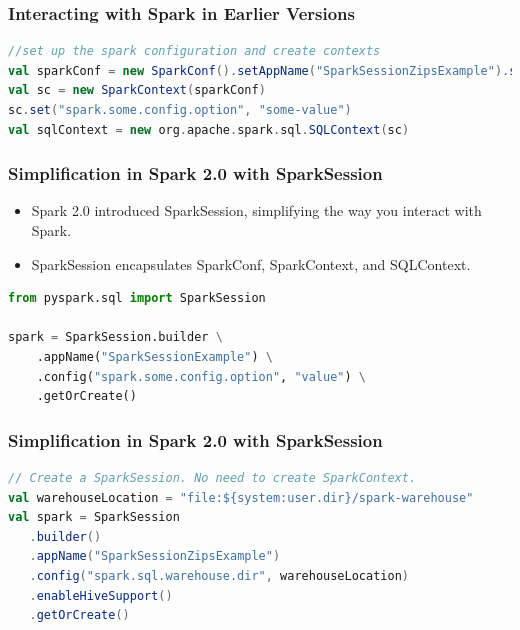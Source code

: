 \begin{frame}[fragile]
    \frametitle{Interacting with Spark in Earlier Versions}

    \begin{lstlisting}[language=Scala,label={lst:scala-spark-context},caption={Scala: Create SparkContext in old Spark versions}]
//set up the spark configuration and create contexts
val sparkConf = new SparkConf().setAppName("SparkSessionZipsExample").setMaster("local")
val sc = new SparkContext(sparkConf)
sc.set("spark.some.config.option", "some-value")
val sqlContext = new org.apache.spark.sql.SQLContext(sc)
    \end{lstlisting}

\end{frame}


\begin{frame}[fragile]
    \frametitle{Simplification in Spark 2.0 with SparkSession}

    \begin{itemize}
        \item Spark 2.0 introduced SparkSession, simplifying the way you interact with Spark.
        \item SparkSession encapsulates SparkConf, SparkContext, and SQLContext.
    \end{itemize}

    \begin{lstlisting}[language=Python,label={lst:spark-session-python-example},caption={Pyspark: Create SparkSession}]
from pyspark.sql import SparkSession

spark = SparkSession.builder \
    .appName("SparkSessionExample") \
    .config("spark.some.config.option", "value") \
    .getOrCreate()
    \end{lstlisting}

\end{frame}
\begin{frame}[fragile]
    \frametitle{Simplification in Spark 2.0 with SparkSession}
    \begin{lstlisting}[language=Scala,label={lst:spark-session-scala-example},caption={Spark: Create SparkSession}]
// Create a SparkSession. No need to create SparkContext.
val warehouseLocation = "file:${system:user.dir}/spark-warehouse"
val spark = SparkSession
   .builder()
   .appName("SparkSessionZipsExample")
   .config("spark.sql.warehouse.dir", warehouseLocation)
   .enableHiveSupport()
   .getOrCreate()
    \end{lstlisting}
\end{frame}


